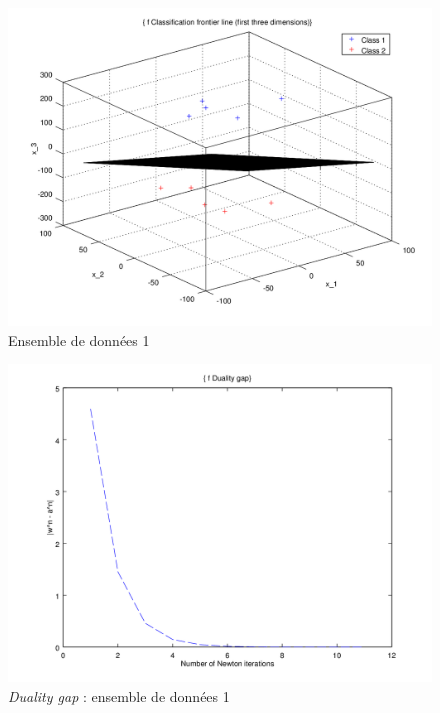 \documentclass{article}
\begin{document}
         \begin{figure}[H]
           \begin{center}
             \includegraphics[scale=0.5]{images/plane1.png}
             \caption{Ensemble de données 1}
           \end{center}
         \end{figure}

         \begin{figure}[H]
           \begin{center}
             \includegraphics[scale=0.5]{images/duality1.png}
             \caption{\emph{Duality gap} : ensemble de données 1}
           \end{center}
         \end{figure}
\end{document}
